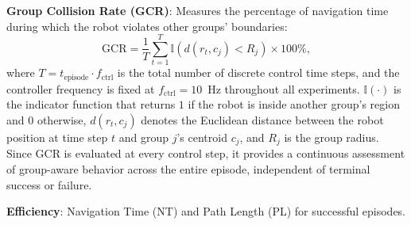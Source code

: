 
\textbf{Group Collision Rate (GCR)}: Measures the percentage of navigation time during which the robot violates other groups' boundaries:
\begin{equation}
\text{GCR} = \frac{1}{T} \sum_{t=1}^{T} \mathbb{I}(d(r_t, c_j) < R_j) \times 100\%,
\end{equation}
where $T = t_{\text{episode}} \cdot f_{\text{ctrl}}$ is the total number of discrete control time steps, and the controller frequency is fixed at $f_{\text{ctrl}} = 10$~Hz throughout all experiments. $\mathbb{I}(\cdot)$ is the indicator function that returns $1$ if the robot is inside another group's region and $0$ otherwise, $d(r_t, c_j)$ denotes the Euclidean distance between the robot position at time step $t$ and group $j$'s centroid $c_j$, and $R_j$ is the group radius. Since GCR is evaluated at every control step, it provides a continuous assessment of group-aware behavior across the entire episode, independent of terminal success or failure. 



\textbf{Efficiency}: Navigation Time (NT) and Path Length (PL) for successful episodes.

